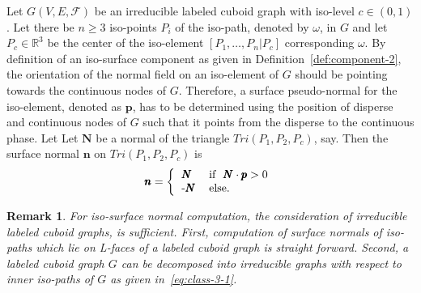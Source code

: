 \documentclass[a4paper,11pt]{article}
\newtheorem{remark}[theorem]{Remark}
\begin{document}
Let $G(V,E,\mathcal{F})$ be an irreducible labeled cuboid graph with iso-level $c\in (0,1)$. Let there be
$n\geq 3$ iso-points $P_i$ of the iso-path, denoted by $\omega$, in $G$ and let $P_c\in\mathbb{R}^3$ be the
center of the iso-element $[P_1,\ldots,P_n|P_c]$ corresponding $\omega$. By definition of an iso-surface
component as given in Definition~\ref{def:component-2}, the orientation of the normal field on an
iso-element of $G$ should be pointing towards the continuous nodes of $G$. Therefore, a surface pseudo-normal
for the iso-element, denoted as $\pmb{p}$, has to be determined using the position of
disperse and continuous nodes of $G$ such that it points from the disperse to the continuous phase. Let
Let $\pmb{N}$ be a normal of the triangle $Tri(P_1,P_2,P_c)$, say. Then the surface normal $\pmb{n}$ on
$Tri(P_1,P_2,P_c)$ is
\begin{equation}
\pmb{n}=\left\{\begin{tabular}{ll}
$\pmb{N}$ &\mbox{if } $\pmb{N}\cdot \pmb{p}>0$\\
-$\pmb{N}$ &\mbox{else.}
\end{tabular}
\right.
\label{eq:curve-1}
\end{equation}

\begin{remark} For iso-surface normal computation, the consideration of irreducible labeled cuboid graphs,
is sufficient. First, computation of surface normals of iso-paths which lie on L-faces of a labeled cuboid graph
is straight forward. Second, a labeled cuboid graph $G$ can be decomposed into irreducible graphs with respect
to inner iso-paths of $G$ as given in~\eqref{eq:class-3-1}.
\label{rem:second-remark}
\end{remark}
\end{document}
